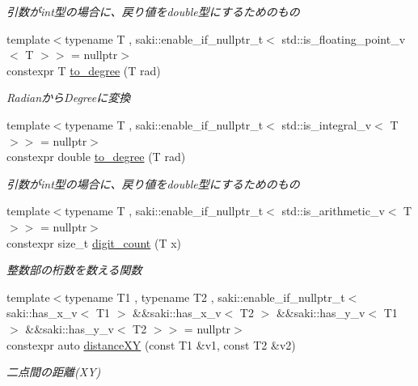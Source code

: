 \begin{DoxyCompactItemize}
\begin{DoxyCompactList}\small\item\em 引数がint型の場合に、戻り値をdouble型にするためのもの \end{DoxyCompactList}\item 
{\footnotesize template$<$typename T , saki\+::enable\+\_\+if\+\_\+nullptr\+\_\+t$<$ std\+::is\+\_\+floating\+\_\+point\+\_\+v$<$ T $>$$>$  = nullptr$>$ }\\constexpr T \mbox{\hyperlink{namespacesaki_af9f6d8f2c0663a0452c7edd17bf5daf0}{to\+\_\+degree}} (T rad)
\begin{DoxyCompactList}\small\item\em Radianから\+Degreeに変換 \end{DoxyCompactList}\item 
{\footnotesize template$<$typename T , saki\+::enable\+\_\+if\+\_\+nullptr\+\_\+t$<$ std\+::is\+\_\+integral\+\_\+v$<$ T $>$$>$  = nullptr$>$ }\\constexpr double \mbox{\hyperlink{namespacesaki_aa7cb33956f8d7354b485aee878d7805d}{to\+\_\+degree}} (T rad)
\begin{DoxyCompactList}\small\item\em 引数がint型の場合に、戻り値をdouble型にするためのもの \end{DoxyCompactList}\item 
{\footnotesize template$<$typename T , saki\+::enable\+\_\+if\+\_\+nullptr\+\_\+t$<$ std\+::is\+\_\+arithmetic\+\_\+v$<$ T $>$$>$  = nullptr$>$ }\\constexpr size\+\_\+t \mbox{\hyperlink{namespacesaki_a467dee57b7bbe101146713a82acfe95e}{digit\+\_\+count}} (T x)
\begin{DoxyCompactList}\small\item\em 整数部の桁数を数える関数 \end{DoxyCompactList}\item 
{\footnotesize template$<$typename T1 , typename T2 , saki\+::enable\+\_\+if\+\_\+nullptr\+\_\+t$<$ saki\+::has\+\_\+x\+\_\+v$<$ T1 $>$ \&\&saki\+::has\+\_\+x\+\_\+v$<$ T2 $>$ \&\&saki\+::has\+\_\+y\+\_\+v$<$ T1 $>$ \&\&saki\+::has\+\_\+y\+\_\+v$<$ T2 $>$$>$  = nullptr$>$ }\\constexpr auto \mbox{\hyperlink{namespacesaki_ae6eddecfb6a747238185b21c8ee1cd60}{distance\+XY}} (const T1 \&v1, const T2 \&v2)
\begin{DoxyCompactList}\small\item\em 二点間の距離(\+X\+Y) \end{DoxyCompactList}\item 

\end{DoxyCompactItemize}
